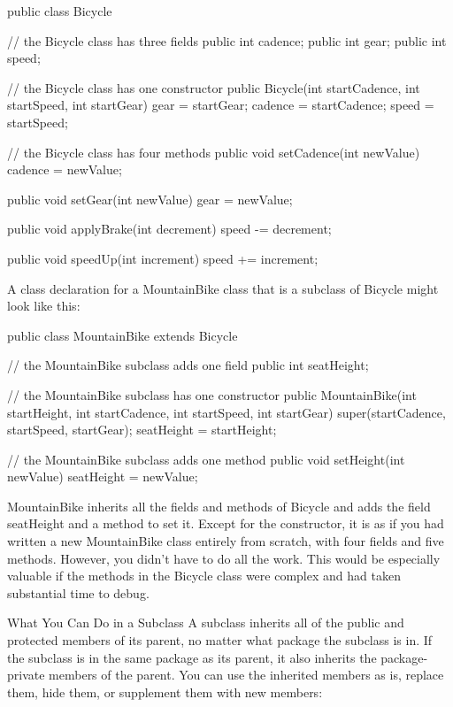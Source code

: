 public class Bicycle {

    // the Bicycle class has three fields
    public int cadence;
    public int gear;
    public int speed;

    // the Bicycle class has one constructor
    public Bicycle(int startCadence, int startSpeed, int startGear) {
        gear = startGear;
        cadence = startCadence;
        speed = startSpeed;
    }

    // the Bicycle class has four methods
    public void setCadence(int newValue) {
        cadence = newValue;
    }

    public void setGear(int newValue) {
        gear = newValue;
    }

    public void applyBrake(int decrement) {
        speed -= decrement;
    }

    public void speedUp(int increment) {
        speed += increment;
    }

}
A class declaration for a MountainBike class that is a subclass of Bicycle might look like this:

public class MountainBike extends Bicycle {

    // the MountainBike subclass adds one field
    public int seatHeight;

    // the MountainBike subclass has one constructor
    public MountainBike(int startHeight,
                        int startCadence,
                        int startSpeed,
                        int startGear) {
        super(startCadence, startSpeed, startGear);
        seatHeight = startHeight;
    }

    // the MountainBike subclass adds one method
    public void setHeight(int newValue) {
        seatHeight = newValue;
    }
}
MountainBike inherits all the fields and methods of Bicycle and adds the field seatHeight and a method to set it. Except for the constructor, it is as if you had written a new MountainBike class entirely from scratch, with four fields and five methods. However, you didn't have to do all the work. This would be especially valuable if the methods in the Bicycle class were complex and had taken substantial time to debug.

What You Can Do in a Subclass
A subclass inherits all of the public and protected members of its parent, no matter what package the subclass is in. If the subclass is in the same package as its parent, it also inherits the package-private members of the parent. You can use the inherited members as is, replace them, hide them, or supplement them with new members:

